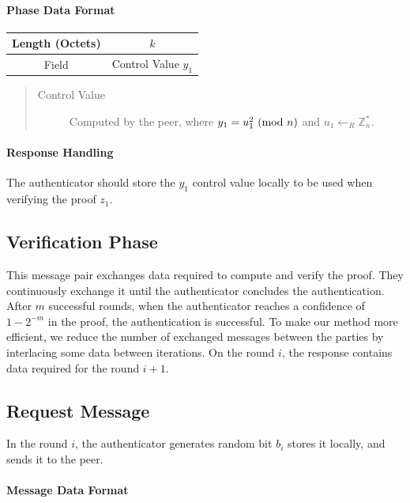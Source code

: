 \paragraph{Phase Data Format}

\begin{center}
\begin{tabular}{|c|c|}
	\hline
	Length (Octets) & $k$ \\
	\hline
	Field & Control Value $y_1$\\
	\hline
\end{tabular}
\end{center}

\bigskip
\begin{quote}
\begin{description}
	\item[Control Value] Computed by the peer, where $y_1 = u_1^2 \ (\mathrm{mod}\ n)$ and $u_1 \leftarrow_R \mathbb{Z}^*_n$.
\end{description}
\end{quote}

\paragraph{Response Handling}
The authenticator should store the $y_1$ control value locally to be used when verifying the proof $z_1$.

\subsection{Verification Phase}
This message pair exchanges data required to compute and verify the proof.
They continuously exchange it until the authenticator concludes the authentication.
After $m$ successful rounds, when the authenticator reaches a confidence of $1 - 2^{-m}$ in the proof, the authentication is successful.
To make our method more efficient, we reduce the number of exchanged messages between the parties by interlacing some data between iterations.
On the round $i$, the response contains data required for the round $i+1$.


\subsection*{Request Message}
In the round $i$, the authenticator generates random bit $b_i$ stores it locally, and sends it to the peer.
\paragraph{Message Data Format}


